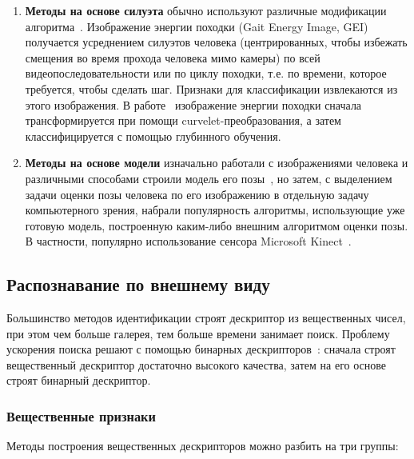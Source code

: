\documentclass[a4paper,twoside,11pt]{article}
\numberwithin{equation}{section}
\begin{document}
\begin{enumerate}
    \item \textbf{Методы на основе силуэта} обычно используют различные модификации алгоритма~\cite{man2006individual}. Изображение энергии походки (Gait Energy Image, GEI) получается усреднением силуэтов человека (центрированных, чтобы избежать смещения во время прохода человека мимо камеры) по всей видеопоследовательности или по циклу походки, т.е. по времени, которое требуется, чтобы сделать шаг. Признаки для классификации извлекаются из этого изображения. В работе~\cite{chhatrala2017gait} изображение энергии походки сначала трансформируется при помощи curvelet-преобразования, а затем классифицируется с помощью глубинного обучения.
    
    \item \textbf{Методы на основе модели} изначально работали с изображениями человека и различными способами строили модель его позы~\cite{bobick2001gait,lee2002gait}, но затем, с выделением задачи оценки позы человека по его изображению в отдельную задачу компьютерного зрения, набрали популярность алгоритмы, использующие уже готовую модель, построенную каким-либо внешним алгоритмом оценки позы. В частности, популярно использование сенсора Microsoft Kinect~\cite{kastaniotis2015framework,rouzbeh2015human,yang2016relative}.

\end{enumerate}

\subsection{Распознавание по внешнему виду}

Большинство методов идентификации строят дескриптор из вещественных чисел, при этом чем больше галерея, тем больше времени занимает поиск. Проблему ускорения поиска решают с помощью бинарных дескрипторов~\cite{lin2015deep}: сначала строят вещественный дескриптор достаточно высокого качества, затем на его основе строят бинарный дескриптор.

\subsubsection{Вещественные признаки}

Методы построения вещественных дескрипторов можно разбить на три группы:
\end{document}
